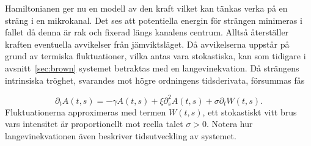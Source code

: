 Hamiltonianen ger nu en modell av den kraft vilket kan tänkas verka på en sträng i en mikrokanal. Det ses att potentiella energin för strängen minimeras i fallet då denna är rak och fixerad längs kanalens centrum. Alltså återställer kraften eventuella avvikelser från jämviktsläget. Då avvikelserna uppstår på grund av termiska fluktuationer, vilka antas vara stokastiska, kan som tidigare i avsnitt~\ref{sec:brown} systemet betraktas med en langevinekvation. Då strängens intrinsiska tröghet, svarandes mot högre ordningens tidsderivata, försummas fås\cite{PhysRevE.60.4671}

\begin{equation}
\label{mans}
    \partial_{t}A(t,s)=-\gamma A(t,s)+\xi \partial_{s}^{2}A(t,s)+\sigma \partial_{t}W(t,s).
\end{equation}
Fluktuationerna approximeras med termen $W(t,s)$, ett stokastiskt vitt brus vars intensitet är proportionellt mot reella talet $\sigma>0$. Notera hur langevinekvationen även beskriver tidsutveckling av systemet.


